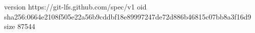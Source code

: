 version https://git-lfs.github.com/spec/v1
oid sha256:0664e2108f505e22a56b9cddbf18e89997247de72d886b46815c07bb8a3f16d9
size 87544
